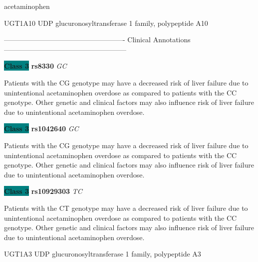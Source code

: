 \documentclass{resume} %
\begin{document}
\begin{rSection}{ acetaminophen }
\begin{rSubsection}{ UGT1A10 }{ UDP glucuronosyltransferase 1 family, polypeptide A10 }{}{}
\item[] ---------------------------------------------------- Clinical Annotations -----------------------------------------------------\newline
\item \textbf{\colorbox{teal} {Class 3}} \textbf{ rs8330 } \textit{ GC }
\item[] Patients with the CG genotype may have a decreased risk of liver failure due to unintentional acetaminophen overdose as compared to patients with the CC genotype. Other genetic and clinical factors may also influence risk of liver failure due to unintentional acetaminophen overdose.\item \textbf{\colorbox{teal} {Class 3}} \textbf{ rs1042640 } \textit{ GC }
\item[] Patients with the CG genotype may have a decreased risk of liver failure due to unintentional acetaminophen overdose as compared to patients with the CC genotype. Other genetic and clinical factors may also influence risk of liver failure due to unintentional acetaminophen overdose.\item \textbf{\colorbox{teal} {Class 3}} \textbf{ rs10929303 } \textit{ TC }
\item[] Patients with the CT genotype may have a decreased risk of liver failure due to unintentional acetaminophen overdose as compared to patients with the CC genotype. Other genetic and clinical factors may also influence risk of liver failure due to unintentional acetaminophen overdose.
\end{rSubsection}\begin{rSubsection}{ UGT1A3 }{ UDP glucuronosyltransferase 1 family, polypeptide A3 }{}{}
\item[]


\end{rSubsection}
\end{rSection}
\end{document}
